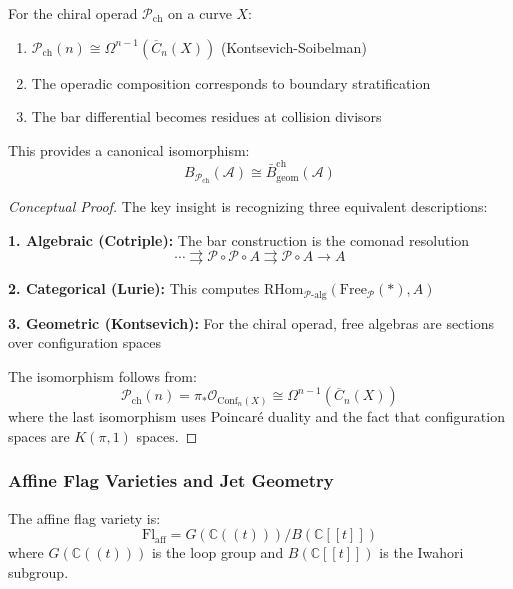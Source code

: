 \begin{theorem}\label{thm:geometric-bridge}
For the chiral operad $\mathcal{P}_{\text{ch}}$ on a curve $X$:
\begin{enumerate}
\item $\mathcal{P}_{\text{ch}}(n) \cong \Omega^{n-1}(\overline{C}_n(X))$ (Kontsevich-Soibelman)
\item The operadic composition corresponds to boundary stratification
\item The bar differential becomes residues at collision divisors
\end{enumerate}

This provides a canonical isomorphism:
$$B_{\mathcal{P}_{\text{ch}}}(\mathcal{A}) \cong \bar{B}^{\text{ch}}_{\text{geom}}(\mathcal{A})$$
\end{theorem}

\begin{proof}[Conceptual Proof]
The key insight is recognizing three equivalent descriptions:

\textbf{1. Algebraic (Cotriple):} The bar construction is the comonad resolution
$$\cdots \rightrightarrows \mathcal{P} \circ \mathcal{P} \circ A \rightrightarrows \mathcal{P} \circ A \to A$$

\textbf{2. Categorical (Lurie):} This computes $\text{RHom}_{\mathcal{P}\text{-alg}}(\text{Free}_{\mathcal{P}}(\ast), A)$

\textbf{3. Geometric (Kontsevich):} For the chiral operad, free algebras are sections over configuration spaces

The isomorphism follows from:
$$\mathcal{P}_{\text{ch}}(n) = \pi_*\mathcal{O}_{\text{Conf}_n(X)} \cong \Omega^{n-1}(\overline{C}_n(X))$$
where the last isomorphism uses Poincaré duality and the fact that configuration spaces are $K(\pi,1)$ spaces.
\end{proof}

\subsubsection{Affine Flag Varieties and Jet Geometry}

\begin{definition}\label{def:aff-flag}
The affine flag variety is:
\[
\mathrm{Fl}_{\mathrm{aff}} = G(\mathbb{C}((t)))/B(\mathbb{C}[[t]])
\]
where $G(\mathbb{C}((t)))$ is the loop group and $B(\mathbb{C}[[t]])$ is the Iwahori subgroup.
\end{definition}

